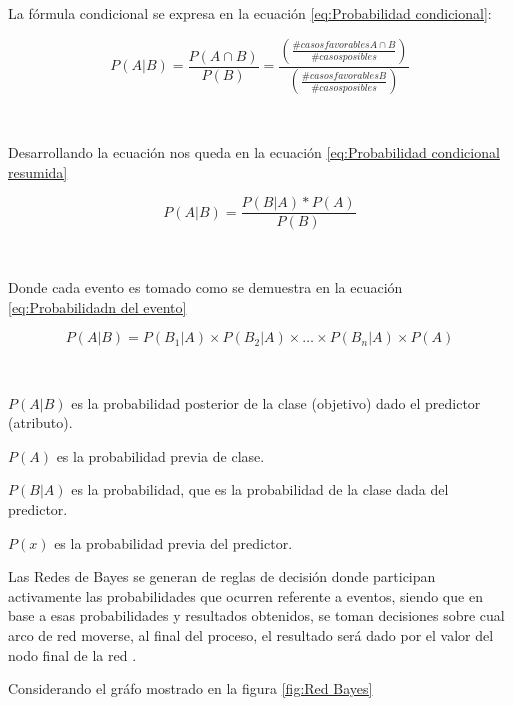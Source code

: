 \par La fórmula condicional se expresa en la ecuación \ref{eq:Probabilidad condicional}:\\
\begin{Large}
	\begin{equation}
		P(A|B)=\frac{P(A \cap B)}{P(B)}= \frac{(\frac{\#casos favorables A \cap B}{\#casos posibles})}{(\frac{\#casos favorables B}{\#casos posibles})}
		\label{eq:Probabilidad condicional}
	\end{equation}
\end{Large}\\
\par Desarrollando la ecuación nos queda en la ecuación \ref{eq:Probabilidad condicional resumida}\\
\begin{Large}
	\begin{equation}
		P(A|B)=\frac{P(B|A)*P(A)}{P(B)}
		\label{eq:Probabilidad condicional resumida}
	\end{equation}
\end{Large}\\
\par Donde cada evento es tomado como se demuestra en la ecuación \ref{eq:Probabilidadn del evento}\\
\begin{large}
	\begin{equation}
		P(A|B)= P(B_{1}|A) \times P(B_{2}|A) \times … \times P(B_{n}|A) \times P(A)
		\label{eq:Probabilidadn del evento}
	\end{equation}
\end{large}\\
\par $P(A|B)$ es la probabilidad posterior de la clase (objetivo) dado el predictor (atributo).
\par $P(A)$ es la probabilidad previa de clase.
\par $P(B|A)$ es la probabilidad, que es la probabilidad de la clase dada del predictor.
\par  $P(x)$ es la probabilidad previa del predictor.\\

\par Las Redes de Bayes se generan de reglas de decisión donde participan activamente las probabilidades que ocurren referente a eventos, siendo que en base a esas probabilidades y resultados obtenidos, se toman decisiones sobre cual arco de red moverse, al final del proceso, el resultado será dado por el valor del nodo final de la red \cite{Bell15}.\\
\par Considerando el gráfo mostrado en la figura \ref{fig:Red Bayes}

